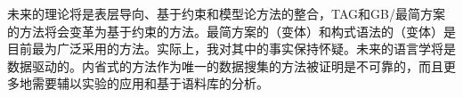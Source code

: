 未来的理论将是表层导向、基于约束和模型论方法的整合，TAG\indextagc 和GB/最简方案\indexgbc \indexmpc 的方法将会变革为基于约束的方法。最简方案的（变体）和构式语法的（变体）是目前最为广泛采用的方法。实际上，我对其中的事实保持怀疑。未来的语言学将是数据驱动的。内省式的方法作为唯一的数据搜集的方法被证明是不可靠的\citep{Mueller2007c,MM2009a}，而且更多地需要辅以实验的应用和基于语料库的分析。

